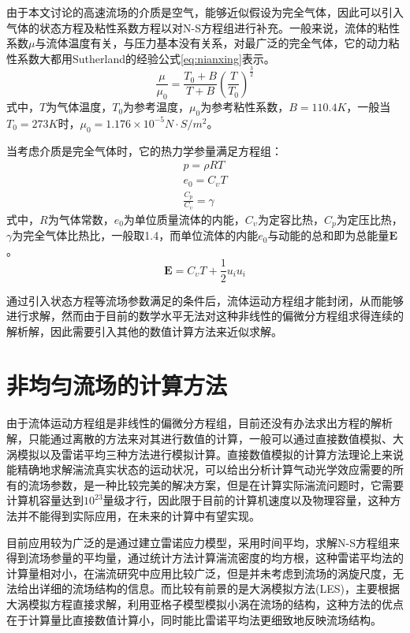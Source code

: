 由于本文讨论的高速流场的介质是空气，能够近似假设为完全气体，因此可以引入气体的状态方程及粘性系数方程以对N-S方程组进行补充。一般来说，流体的粘性系数$\mu$与流体温度有关，与压力基本没有关系，对最广泛的完全气体，它的动力粘性系数大都用Sutherland的经验公式\eqref{eq:nianxing}表示。
\begin{equation}
\frac{\mu}{\mu_0}=\frac{T_0+B}{T+B}(\frac{T}{T_0})^{\frac{3}{2}}
\label{eq:nianxing}
\end{equation}
式中，$T$为气体温度，$T_0$为参考温度，$\mu_0$为参考粘性系数，$B=110.4K$，一般当$T_0=273K$时，$\mu_0=1.176\times 10^{-5}N\cdot S/m^2$。

当考虑介质是完全气体时，它的热力学参量满足方程组：
\begin{subequations}
\label{eq:zhuangtai1}
\begin{align}
p=\rho RT\\
e_0=C_\upsilon T\\
\frac{C_p}{C_\upsilon}=\gamma
\end{align}
\end{subequations}
式中，$R$为气体常数，$e_0$为单位质量流体的内能，$C_\upsilon$为定容比热，$C_p$为定压比热，$\gamma$为完全气体比热比，一般取1.4，而单位流体的内能$e_0$与动能的总和即为总能量$\mathbf{E}$。
\begin{equation}
\mathbf{E}=C_\upsilon T+\frac{1}{2}u_iu_i
\end{equation}

通过引入状态方程等流场参数满足的条件后，流体运动方程组才能封闭，从而能够进行求解，然而由于目前的数学水平无法对这种非线性的偏微分方程组求得连续的解析解，因此需要引入其他的数值计算方法来近似求解。
\section{非均匀流场的计算方法}
由于流体运动方程组是非线性的偏微分方程组，目前还没有办法求出方程的解析解，只能通过离散的方法来对其进行数值的计算\cite{zhang2012}，一般可以通过直接数值模拟、大涡模拟以及雷诺平均三种方法进行模拟计算。直接数值模拟的计算方法理论上来说能精确地求解湍流真实状态的运动状况，可以给出分析计算气动光学效应需要的所有的流场参数，是一种比较完美的解决方案，但是在计算实际湍流问题时，它需要计算机容量达到$10^{23}$量级才行，因此限于目前的计算机速度以及物理容量，这种方法并不能得到实际应用，在未来的计算中有望实现。

目前应用较为广泛的是通过建立雷诺应力模型，采用时间平均，求解N-S方程组来得到流场参量的平均量，通过统计方法计算湍流密度的均方根，这种雷诺平均法的计算量相对小，在湍流研究中应用比较广泛，但是并未考虑到流场的涡旋尺度，无法给出详细的流场结构的信息。而比较有前景的是大涡模拟方法(LES)，主要根据大涡模拟方程直接求解，利用亚格子模型模拟小涡在流场的结构，这种方法的优点在于计算量比直接数值计算小，同时能比雷诺平均法更细致地反映流场结构。

